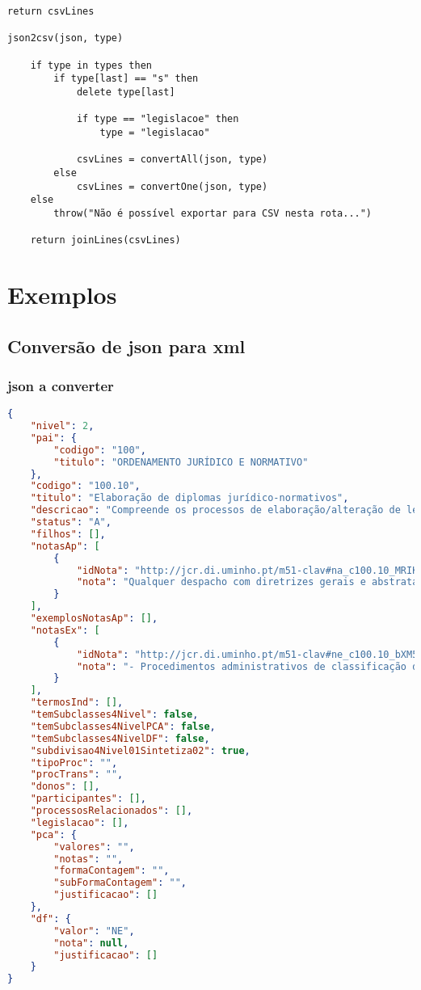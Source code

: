 \begin{lstlisting}[language=pseudocode, caption=Algoritmo de conversão de \acrshort{json} para \acrshort{csv}]
    return csvLines

json2csv(json, type)

    if type in types then
        if type[last] == "s" then
            delete type[last]

            if type == "legislacoe" then
                type = "legislacao"

            csvLines = convertAll(json, type)
        else
            csvLines = convertOne(json, type)
    else
        throw("Não é possível exportar para CSV nesta rota...")

    return joinLines(csvLines)
\end{lstlisting}

\chapter{Exemplos}

\section{Conversão de \acrshort{json} para \acrshort{xml}}\label{conv:jsonTOxml}

\subsection{\acrshort{json} a converter}\label{exem:json}
\begin{lstlisting}[language=json, caption=\acrshort{json} exemplo a converter]
{
    "nivel": 2,
    "pai": {
        "codigo": "100",
        "titulo": "ORDENAMENTO JURÍDICO E NORMATIVO"
    },
    "codigo": "100.10",
    "titulo": "Elaboração de diplomas jurídico-normativos",
    "descricao": "Compreende os processos de elaboração/alteração de legislação, de regulamentos e de diretivas políticas ou operacionais portuguesas.",
    "status": "A",
    "filhos": [],
    "notasAp": [
        {
            "idNota": "http://jcr.di.uminho.pt/m51-clav#na_c100.10_MRIKl-RBu_2sz5u9FzPqH",
            "nota": "Qualquer despacho com diretrizes gerais e abstratas"
        }
    ],
    "exemplosNotasAp": [],
    "notasEx": [
        {
            "idNota": "http://jcr.di.uminho.pt/m51-clav#ne_c100.10_bXM5qoj-hKZt6cijQktaj",
            "nota": "- Procedimentos administrativos de classificação do património cultural devem ser considerados em \"Reconhecimentos e permissões/ Classificação e declaração de interesse ou utilidade pública\" (450.20)"
        }
    ],
    "termosInd": [],
    "temSubclasses4Nivel": false,
    "temSubclasses4NivelPCA": false,
    "temSubclasses4NivelDF": false,
    "subdivisao4Nivel01Sintetiza02": true,
    "tipoProc": "",
    "procTrans": "",
    "donos": [],
    "participantes": [],
    "processosRelacionados": [],
    "legislacao": [],
    "pca": {
        "valores": "",
        "notas": "",
        "formaContagem": "",
        "subFormaContagem": "",
        "justificacao": []
    },
    "df": {
        "valor": "NE",
        "nota": null,
        "justificacao": []
    }
}
\end{lstlisting}

